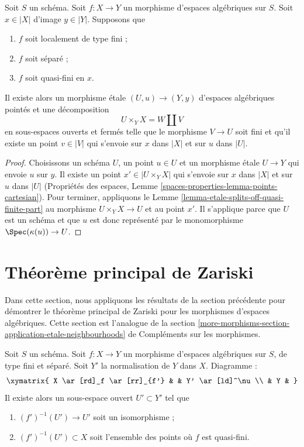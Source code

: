 \begin{lemma}
\label{lemma-etale-splits-off-just-one-quasi-finite-part}
Soit $S$ un schéma.
Soit $f : X \to Y$ un morphisme d'espaces algébriques sur $S$.
Soit $x \in |X|$ d'image $y \in |Y|$. Supposons que
\begin{enumerate}
\item $f$ soit localement de type fini ;
\item $f$ soit séparé ;
\item $f$ soit quasi-fini en $x$.
\end{enumerate}
Il existe alors un morphisme étale $(U, u) \to (Y, y)$
d'espaces algébriques pointés et une décomposition
$$
U \times_Y X = W \amalg V
$$
en sous-espaces ouverts et fermés telle que le morphisme $V \to U$ soit fini
et qu'il existe un point $v \in |V|$ qui s'envoie sur $x$ dans $|X|$
et sur $u$ dans $|U|$.
\end{lemma}

\begin{proof}
Choisissons un schéma $U$, un point $u \in U$ et un morphisme étale
$U \to Y$ qui envoie $u$ sur $y$. Il existe un point $x' \in |U \times_Y X|$
qui s'envoie sur $x$ dans $|X|$ et sur $u$ dans $|U|$ (Propriétés des espaces,
Lemme \ref{spaces-properties-lemma-points-cartesian}).
Pour terminer, appliquons le Lemme \ref{lemma-etale-splits-off-quasi-finite-part}
au morphisme $U \times_Y X \to U$ et au point $x'$.
Il s'applique parce que $U$ est un schéma et que $u$ est donc représenté
par le monomorphisme $\Spec(\kappa(u)) \to U$.
\end{proof}










\section{Théorème principal de Zariski}
\label{section-structure-quasi-finite}

\noindent
Dans cette section, nous appliquons les résultats de la section précédente pour
démontrer le théorème principal de Zariski pour les morphismes d'espaces algébriques.
Cette section est l'analogue de la section
\ref{more-morphisms-section-application-etale-neighbourhoods} de Compléments sur les morphismes.

\begin{lemma}
\label{lemma-finite-type-separated}
Soit $S$ un schéma. Soit $f : X \to Y$ un morphisme d'espaces
algébriques sur $S$, de type fini et séparé.
Soit $Y'$ la normalisation de $Y$ dans $X$. Diagramme :
$$
\xymatrix{
X \ar[rd]_f \ar[rr]_{f'} & & Y' \ar[ld]^\nu \\
& Y &
}
$$
Il existe alors un sous-espace ouvert $U' \subset Y'$ tel que
\begin{enumerate}
\item $(f')^{-1}(U') \to U'$ soit un isomorphisme ;
\item $(f')^{-1}(U') \subset X$ soit l'ensemble des points où
$f$ est quasi-fini.
\end{enumerate}
\end{lemma}

